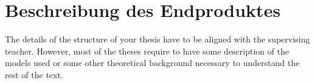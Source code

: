 \chapter{Beschreibung des Endproduktes}\label{cha:theoretical-background}
The details of the structure of your thesis have to be aligned with the supervising teacher. However, most of the theses require to have some description of the models used or some other theoretical background necessary to understand the rest of the text.